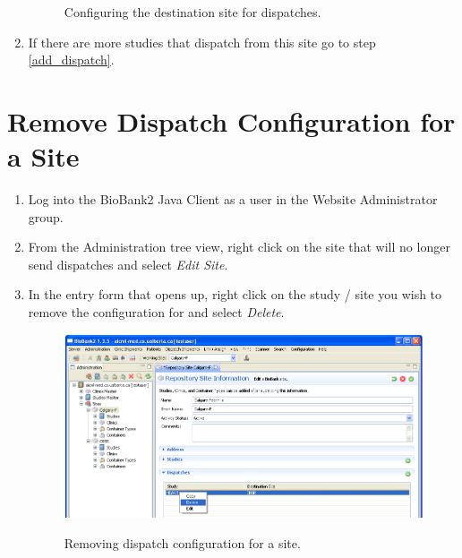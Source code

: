 \begin{enumerate}
\begin{figure}[H]
      \caption{Configuring the destination site for dispatches.}
      \label{fig:dispatch_add_config_dest_site}
    \end{figure}
  \item If there are more studies that dispatch from this site go to step \ref{add_dispatch}.
\end{enumerate}
\section{Remove Dispatch Configuration for a Site}
\label{sec:config_send_remove}
\begin{enumerate}
  \item Log into the BioBank2 Java Client as a user in the Website
    Administrator group.
  \item From the Administration tree view, right click on the site that will no longer send
    dispatches and select \emph{Edit Site}.
  \item In the entry form that opens up, right click on the study / site you
    wish to remove the configuration for and select \emph{Delete}.
    \begin{figure}[H]
      \centering
      \scalebox{0.5}
      { \includegraphics*{screenshots/dispatch_del_config} }
      \caption{Removing dispatch configuration for a site.}
      \label{fig:dispatch_del_config}
    \end{figure}
\end{enumerate}

